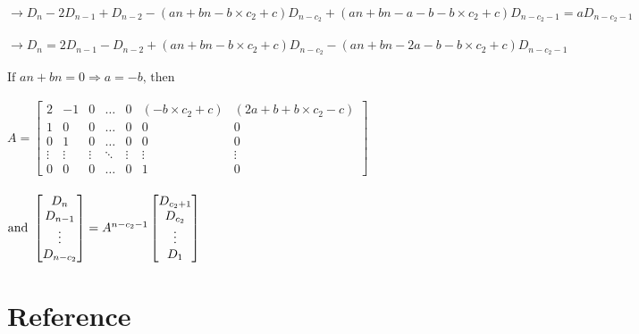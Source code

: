 \begin{enumerate}
    \\
    $\rightarrow D_n - 2D_{n-1} + D_{n-2} - (an+bn-b\times c_2+c)D_{n-c_2} + (an+bn-a-b-b\times c_2+c)D_{n-c_2-1} = aD_{n-c_2-1}$\\
    \\
    $\rightarrow D_n = 2D_{n-1} - D_{n-2} + (an+bn-b\times c_2+c)D_{n-c_2} - (an+bn-2a-b-b\times c_2+c)D_{n-c_2-1}$\\
    \\
    $\text{If } an+bn=0 \Rightarrow a=-b \text{, then }$\\
    \\
    $A=\begin{bmatrix}
    2 & -1 & 0 & \dots & 0 & (-b\times c_2+c) & (2a+b+b\times c_2-c)\\
    1 & 0 & 0 & \dots & 0 & 0 & 0\\
    0 & 1 & 0 & \dots & 0 & 0 & 0\\
    \vdots & \vdots & \vdots & \ddots & \vdots & \vdots & \vdots\\
    0 & 0 & 0 & \dots & 0 & 1 & 0 
    \end{bmatrix}$\\
    \\
    $\text{and }
    \begin{bmatrix}
    D_n \\
    D_{n-1}\\
    \vdots \\
    D_{n-c_2}
    \end{bmatrix}
    =
    A^{n-c_2-1}
    \begin{bmatrix}
    D_{c_2+1} \\
    D_{c_2}\\
    \vdots \\
    D_{1}
    \end{bmatrix}\\$
\end{enumerate}

\section{Reference}
